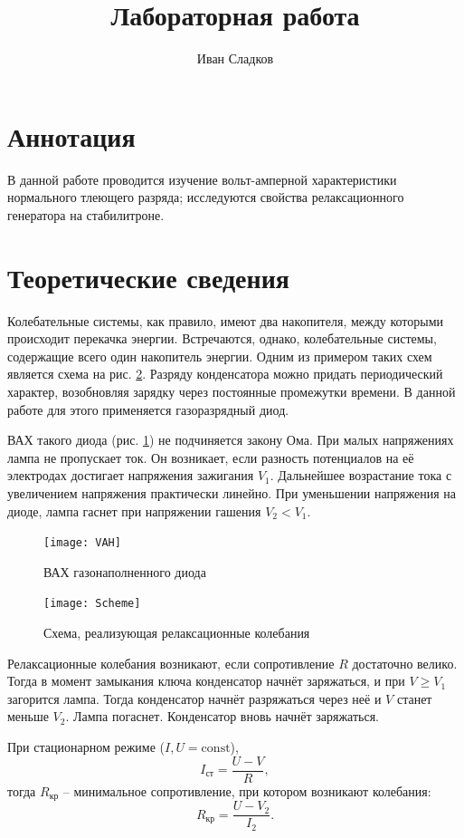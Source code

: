 \documentclass[a4paper]{article}
\title{Лабораторная работа \labnum \space \labname} %
\author{Иван Сладков}
\begin{document}
\maketitle
\thispagestyle{empty}
\section{Аннотация}
В данной работе проводится изучение вольт-амперной характеристики нормального тлеющего разряда; исследуются свойства релаксационного генератора на стабилитроне.

\section{Теоретические сведения}

Колебательные системы, как правило, имеют два накопителя, между которыми происходит перекачка энергии. Встречаются, однако, колебательные системы, содержащие всего один накопитель энергии. Одним из примером таких схем является схема на рис. \ref{fig:scheme}. Разряду конденсатора можно придать периодический характер, возобновляя зарядку через постоянные промежутки времени. В данной работе для этого применяется газоразрядный диод.


ВАХ такого диода (рис. \ref{fig:VAH}) не подчиняется закону Ома. При малых напряжениях лампа не пропускает ток. Он возникает, если разность потенциалов на её электродах достигает напряжения зажигания $ V_1 $. Дальнейшее возрастание тока с увеличением напряжения практически линейно. При уменьшении напряжения на диоде, лампа гаснет при напряжении гашения $ V_2 < V_1 $. 

\begin{figure}[tbp]
	\centering
	\texttt{[image: VAH]}
	\caption{ВАХ газонаполненного диода}
	\label{fig:VAH}
\end{figure}

\begin{figure}[tpb]
	\centering
	\texttt{[image: Scheme]}
	\caption{Схема, реализующая релаксационные колебания}
	\label{fig:scheme}
\end{figure}

Релаксационные колебания возникают, если сопротивление $ R $ достаточно велико. Тогда в момент замыкания ключа конденсатор начнёт заряжаться, и при $ V\ge V_1 $ загорится лампа. Тогда конденсатор начнёт разряжаться через неё и $ V $ станет меньше $ V_2 $. Лампа погаснет. Конденсатор вновь начнёт заряжаться.

При стационарном режиме ($I, U = \mathrm{const} $),
\begin{equation}\label{k}
	I_{ст} = \frac{U-V}{R},	
\end{equation}
тогда $ R_{кр} $ -- минимальное сопротивление, при котором возникают колебания:
\begin{equation}\label{ркр}
	R_{кр} = \frac{U-V_2}{I_2}.
\end{equation}
\end{document}
